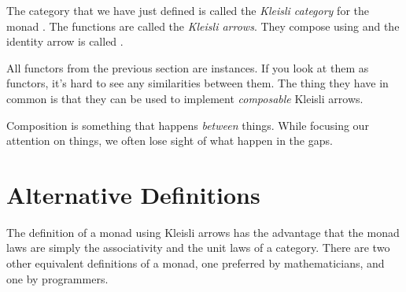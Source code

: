 \documentclass[DaoFP]{subfiles}
\begin{document}
The category that we have just defined is called the \emph{Kleisli category} for the monad . The functions  are called the \emph{Kleisli arrows}. They compose using \hask{<=<} and the identity arrow is called .

All functors from the previous section are  instances. If you look at them as functors, it's hard to see any similarities between them. The thing they have in common is that they can be used to implement \emph{composable} Kleisli arrows. 

Composition is something that happens \emph{between} things. While focusing our attention on things, we often lose sight of what happen in the gaps. 

\section{Alternative Definitions}

The definition of a monad using Kleisli arrows has the advantage that the monad laws are simply the associativity and the unit laws of a category. There are two other equivalent definitions of a monad, one preferred by mathematicians, and one by programmers. 
\end{document}
